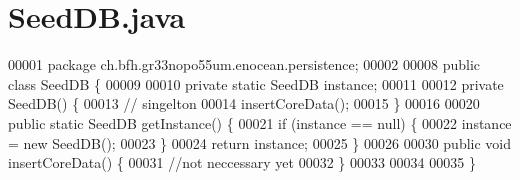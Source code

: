 \section{Seed\+D\+B.\+java}
\label{SeedDB_8java_source}

\begin{DoxyCode}
00001 \textcolor{keyword}{package }ch.bfh.gr33nopo55um.enocean.persistence;
00002 
00008 \textcolor{keyword}{public} \textcolor{keyword}{class }SeedDB \{
00009 
00010     \textcolor{keyword}{private} \textcolor{keyword}{static} SeedDB instance;
00011 
00012     \textcolor{keyword}{private} SeedDB() \{
00013         \textcolor{comment}{// singelton}
00014         insertCoreData();
00015     \}
00016 
00020     \textcolor{keyword}{public} \textcolor{keyword}{static} SeedDB getInstance() \{
00021         \textcolor{keywordflow}{if} (instance == null) \{
00022             instance = \textcolor{keyword}{new} SeedDB();
00023         \}
00024         \textcolor{keywordflow}{return} instance;
00025     \}
00026 
00030     \textcolor{keyword}{public} \textcolor{keywordtype}{void} insertCoreData() \{
00031         \textcolor{comment}{//not neccessary yet}
00032     \}
00033 
00034 
00035 \}
\end{DoxyCode}
